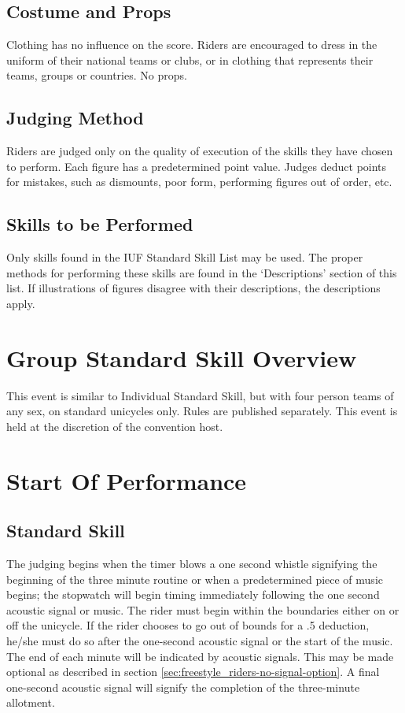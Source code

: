 \subsection{Costume and Props}
Clothing has no influence on the score.
Riders are encouraged to dress in the uniform of their national teams or clubs, or in clothing that represents their teams, groups or countries.
No props.

\subsection{Judging Method}
Riders are judged only on the quality of execution of the skills they have chosen to perform.
Each figure has a predetermined point value.
Judges deduct points for mistakes, such as dismounts, poor form, performing figures out of order, etc.

\subsection{Skills to be Performed}
Only skills found in the IUF Standard Skill List may be used.
The proper methods for performing these skills are found in the `Descriptions' section of this list.
If illustrations of figures disagree with their descriptions, the descriptions apply.

\section{Group Standard Skill Overview}
This event is similar to Individual Standard Skill, but with four person teams of any sex, on standard unicycles only.
Rules are published separately.
This event is held at the discretion of the convention host.

\section{Start Of Performance}

\subsection{Standard Skill}
The judging begins when the timer blows a one second whistle signifying the beginning of the three minute routine or when a predetermined piece of music begins; the stopwatch will begin timing immediately following the one second acoustic signal or music.
The rider must begin within the boundaries either on or off the unicycle.
If the rider chooses to go out of bounds for a .5 deduction, he/she must do so after the one-second acoustic signal or the start of the music.
The end of each minute will be indicated by acoustic signals.
This may be made optional as described in section \ref{sec:freestyle_riders-no-signal-option}.
A final one-second acoustic signal will signify the completion of the three-minute allotment.

